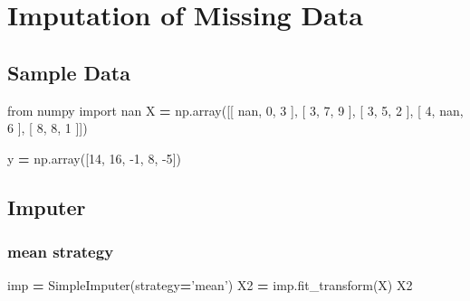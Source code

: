 \documentclass[
]{book}
\newenvironment{Shaded}{\begin{snugshade}}{\end{snugshade}}
\newcommand{\DecValTok}[1]{\textcolor[rgb]{0.06,0.06,0.06}{#1}}
\newcommand{\ImportTok}[1]{#1}
\newcommand{\NormalTok}[1]{#1}
\newcommand{\OperatorTok}[1]{\textcolor[rgb]{0.43,0.43,0.43}{\textbf{#1}}}
\newcommand{\StringTok}[1]{\textcolor[rgb]{0.5,0.5,0.5}{#1}}
\begin{document}
\hypertarget{imputation-of-missing-data}{%
\section{Imputation of Missing Data}\label{imputation-of-missing-data}}

\hypertarget{sample-data-23}{%
\subsection{Sample Data}\label{sample-data-23}}

\begin{Shaded}
\begin{Highlighting}[]
\ImportTok{from}\NormalTok{ numpy }\ImportTok{import}\NormalTok{ nan}
\NormalTok{X }\OperatorTok{=}\NormalTok{ np.array([[ nan, }\DecValTok{0}\NormalTok{,   }\DecValTok{3}\NormalTok{  ],}
\NormalTok{              [ }\DecValTok{3}\NormalTok{,   }\DecValTok{7}\NormalTok{,   }\DecValTok{9}\NormalTok{  ],}
\NormalTok{              [ }\DecValTok{3}\NormalTok{,   }\DecValTok{5}\NormalTok{,   }\DecValTok{2}\NormalTok{  ],}
\NormalTok{              [ }\DecValTok{4}\NormalTok{,   nan, }\DecValTok{6}\NormalTok{  ],}
\NormalTok{              [ }\DecValTok{8}\NormalTok{,   }\DecValTok{8}\NormalTok{,   }\DecValTok{1}\NormalTok{  ]])}

\NormalTok{y }\OperatorTok{=}\NormalTok{ np.array([}\DecValTok{14}\NormalTok{, }\DecValTok{16}\NormalTok{, }\DecValTok{-1}\NormalTok{,  }\DecValTok{8}\NormalTok{, }\DecValTok{-5}\NormalTok{])}
\end{Highlighting}
\end{Shaded}

\hypertarget{imputer}{%
\subsection{Imputer}\label{imputer}}

\hypertarget{mean-strategy}{%
\subsubsection{mean strategy}\label{mean-strategy}}

\begin{Shaded}
\begin{Highlighting}[]
\NormalTok{imp }\OperatorTok{=}\NormalTok{ SimpleImputer(strategy}\OperatorTok{=}\StringTok{'mean'}\NormalTok{)}
\NormalTok{X2 }\OperatorTok{=}\NormalTok{ imp.fit_transform(X)}
\NormalTok{X2}
\end{Highlighting}
\end{Shaded}
\end{document}
